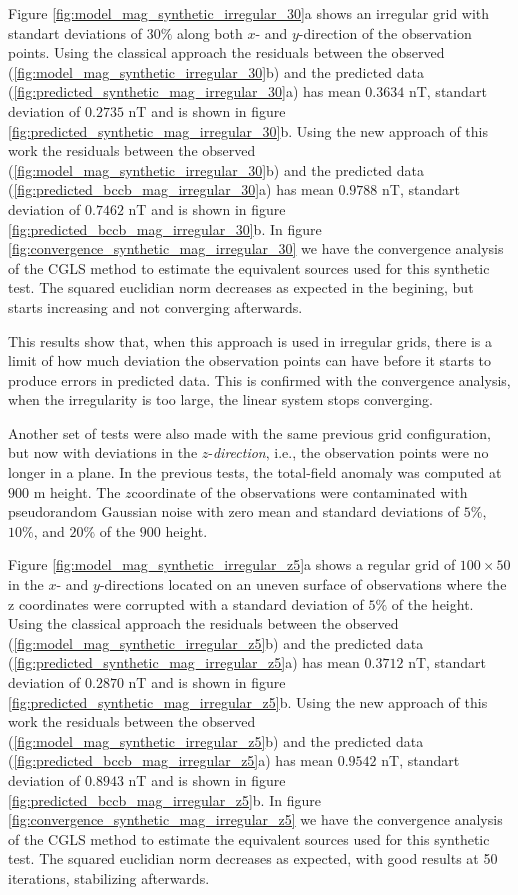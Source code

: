 Figure \ref{fig:model_mag_synthetic_irregular_30}a shows an irregular grid with standart deviations of $30\%$ along both $x$- and $y$-direction of the observation points. Using the classical approach the residuals between the observed (\ref{fig:model_mag_synthetic_irregular_30}b) and the predicted data (\ref{fig:predicted_synthetic_mag_irregular_30}a) has mean $0.3634$ nT, standart deviation of $0.2735$ nT and is shown in figure \ref{fig:predicted_synthetic_mag_irregular_30}b. Using the new approach of this work the residuals between the observed (\ref{fig:model_mag_synthetic_irregular_30}b) and the predicted data (\ref{fig:predicted_bccb_mag_irregular_30}a) has mean $0.9788$ nT, standart deviation of $0.7462$ nT and is shown in figure \ref{fig:predicted_bccb_mag_irregular_30}b.
In figure \ref{fig:convergence_synthetic_mag_irregular_30} we have the convergence analysis of the CGLS method to estimate the equivalent sources used for this synthetic test. The squared euclidian norm decreases as expected in the begining, but starts increasing and not converging afterwards.

This results show that, when this approach is used in irregular grids, there is a limit of how much deviation the observation points can have before it starts to produce errors in predicted data. This is confirmed with the convergence analysis, when the irregularity is too large, the linear system stops converging.

Another set of tests were also made with the same previous grid configuration, but now with deviations in the $z$-\textit{direction}, i.e., the observation points were no longer in a plane. In the previous tests, the total-field anomaly was computed at $900$ m height. The $z $coordinate of the observations were contaminated with
pseudorandom Gaussian noise with zero mean and standard deviations of $5\%$, $10\%$, and $20\%$ of the $900$ height.

Figure \ref{fig:model_mag_synthetic_irregular_z5}a shows a regular grid of $100 \times 50$ in the $x$- and $y$-directions located on an uneven surface of observations where  the z coordinates were corrupted with a standard deviation of  $5\%$ of the height. Using the classical approach the residuals between the observed (\ref{fig:model_mag_synthetic_irregular_z5}b) and the predicted data (\ref{fig:predicted_synthetic_mag_irregular_z5}a) has mean $0.3712$ nT, standart deviation of $0.2870$ nT and is shown in figure \ref{fig:predicted_synthetic_mag_irregular_z5}b. Using the new approach of this work the residuals between the observed (\ref{fig:model_mag_synthetic_irregular_z5}b) and the predicted data (\ref{fig:predicted_bccb_mag_irregular_z5}a) has mean $0.9542$ nT, standart deviation of $0.8943$ nT and is shown in figure \ref{fig:predicted_bccb_mag_irregular_z5}b.
In figure \ref{fig:convergence_synthetic_mag_irregular_z5} we have the convergence analysis of the CGLS method to estimate the equivalent sources used for this synthetic test. The squared euclidian norm decreases as expected, with good results at 50 iterations, stabilizing afterwards.


